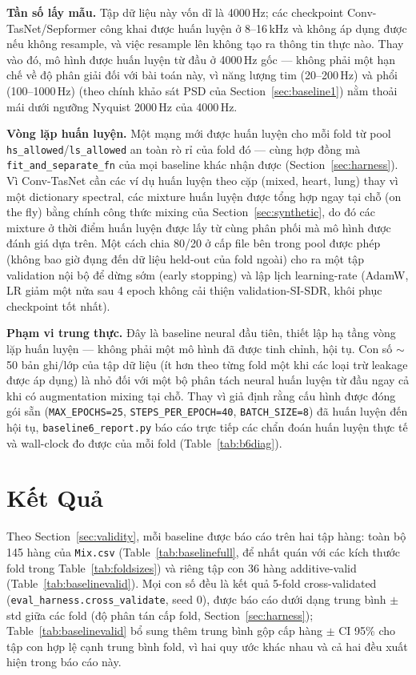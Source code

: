 \documentclass[11pt]{article}
\begin{document}
\textbf{Tần số lấy mẫu.} Tập dữ liệu này vốn dĩ là 4000\,Hz; các
checkpoint Conv-TasNet/Sepformer công khai được huấn luyện ở 8--16\,kHz
và không áp dụng được nếu không resample, và việc resample lên không tạo
ra thông tin thực nào. Thay vào đó, mô hình được huấn luyện từ đầu ở
4000\,Hz gốc --- không phải một hạn chế về độ phân giải đối với bài toán
này, vì năng lượng tim (20--200\,Hz) và phổi (100--1000\,Hz) (theo chính
khảo sát PSD của Section~\ref{sec:baseline1}) nằm thoải mái dưới ngưỡng
Nyquist 2000\,Hz của 4000\,Hz.

\textbf{Vòng lặp huấn luyện.} Một mạng mới được huấn luyện cho mỗi fold
từ pool \texttt{hs\_allowed}/\texttt{ls\_allowed} an toàn rò rỉ của fold
đó --- cùng hợp đồng mà \texttt{fit\_and\_separate\_fn} của mọi baseline
khác nhận được (Section~\ref{sec:harness}). Vì Conv-TasNet cần các ví dụ
huấn luyện theo cặp (mixed, heart, lung) thay vì một dictionary spectral,
các mixture huấn luyện được tổng hợp ngay tại chỗ (on the fly) bằng chính
công thức mixing của Section~\ref{sec:synthetic}, do đó các mixture ở
thời điểm huấn luyện được lấy từ cùng phân phối mà mô hình được đánh giá
dựa trên. Một cách chia 80/20 ở cấp file bên trong pool được phép (không
bao giờ đụng đến dữ liệu held-out của fold ngoài) cho ra một tập validation
nội bộ để dừng sớm (early stopping) và lập lịch learning-rate (AdamW, LR
giảm một nửa sau 4 epoch không cải thiện validation-SI-SDR, khôi phục
checkpoint tốt nhất).

\textbf{Phạm vi trung thực.} Đây là baseline neural đầu tiên, thiết lập
hạ tầng vòng lặp huấn luyện --- không phải một mô hình đã được tinh chỉnh,
hội tụ. Con số $\sim$50 bản ghi/lớp của tập dữ liệu (ít hơn theo từng
fold một khi các loại trừ leakage được áp dụng) là nhỏ đối với một bộ
phân tách neural huấn luyện từ đầu ngay cả khi có augmentation mixing tại
chỗ. Thay vì giả định rằng cấu hình được đóng gói sẵn
(\texttt{MAX\_EPOCHS=25}, \texttt{STEPS\_PER\_EPOCH=40}, \texttt{BATCH\_SIZE=8})
đã huấn luyện đến hội tụ, \texttt{baseline6\_report.py} báo cáo trực tiếp
các chẩn đoán huấn luyện thực tế và wall-clock đo được của mỗi fold
(Table~\ref{tab:b6diag}).

\section{Kết Quả}
\label{sec:results}

Theo Section~\ref{sec:validity}, mỗi baseline được báo cáo trên hai tập
hàng: toàn bộ 145 hàng của \texttt{Mix.csv} (Table~\ref{tab:baselinefull},
để nhất quán với các kích thước fold trong Table~\ref{tab:foldsizes}) và
riêng tập con 36 hàng additive-valid (Table~\ref{tab:baselinevalid}). Mọi
con số đều là kết quả 5-fold cross-validated
(\texttt{eval\_harness.cross\_validate}, seed 0), được báo cáo dưới dạng
trung bình $\pm$ std giữa các fold (độ phân tán cấp fold,
Section~\ref{sec:harness}); Table~\ref{tab:baselinevalid} bổ sung thêm
trung bình gộp cấp hàng $\pm$ CI 95\% cho tập con hợp lệ cạnh trung bình
fold, vì hai quy ước khác nhau và cả hai đều xuất hiện trong báo cáo này.
\end{document}

